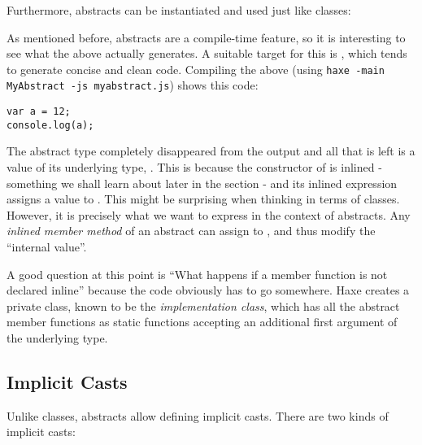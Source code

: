 Furthermore, abstracts can be instantiated and used just like classes:

As mentioned before, abstracts are a compile-time feature, so it is interesting to see what the above actually generates. A suitable target for this is , which tends to generate concise and clean code. Compiling the above (using \texttt{haxe -main MyAbstract -js myabstract.js}) shows this  code:

\begin{lstlisting}
var a = 12;
console.log(a);
\end{lstlisting}
The abstract type  completely disappeared from the output and all that is left is a value of its underlying type, . This is because the constructor of  is inlined - something we shall learn about later in the section  - and its inlined expression assigns a value to . This might be surprising when thinking in terms of classes. However, it is precisely what we want to express in the context of abstracts. Any \emph{inlined member method} of an abstract can assign to , and thus modify the ``internal value''.


A good question at this point is ``What happens if a member function is not declared inline'' because the code obviously has to go somewhere. Haxe creates a private class, known to be the \emph{implementation class}, which has all the abstract member functions as static functions accepting an additional first argument  of the underlying type.







\subsection{Implicit Casts}
\label{types-abstract-implicit-casts}

Unlike classes, abstracts allow defining implicit casts. There are two kinds of implicit casts:

